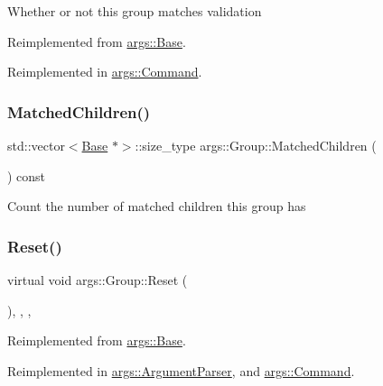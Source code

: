 Whether or not this group matches validation 

Reimplemented from \hyperlink{classargs_1_1_base_ae7ae4ca8ad953be1a353991c1df6ec4d}{args\+::\+Base}.



Reimplemented in \hyperlink{classargs_1_1_command_aebb9c512301e7f0c49689ed92568ef6e}{args\+::\+Command}.

\mbox{\label{classargs_1_1_group_a63697db6c1a28632775f852afface1ce}} 
\subsubsection{\texorpdfstring{Matched\+Children()}{MatchedChildren()}}
{\footnotesize\ttfamily std\+::vector$<$\hyperlink{classargs_1_1_base}{Base} $\ast$$>$\+::size\+\_\+type args\+::\+Group\+::\+Matched\+Children (\begin{DoxyParamCaption}{ }\end{DoxyParamCaption}) const\hspace{0.3cm}{\ttfamily [inline]}}

Count the number of matched children this group has \mbox{\label{classargs_1_1_group_a7ccee0f0ea0902b82029b2ab30f3f84b}} 
\subsubsection{\texorpdfstring{Reset()}{Reset()}}
{\footnotesize\ttfamily virtual void args\+::\+Group\+::\+Reset (\begin{DoxyParamCaption}{ }\end{DoxyParamCaption})\hspace{0.3cm}{\ttfamily [inline]}, {\ttfamily [override]}, {\ttfamily [virtual]}, {\ttfamily [noexcept]}}



Reimplemented from \hyperlink{classargs_1_1_base_ac7cfc851174f71e00173121d3013dab1}{args\+::\+Base}.



Reimplemented in \hyperlink{classargs_1_1_argument_parser_a73b0dc7bc87c3a44345879f34985237f}{args\+::\+Argument\+Parser}, and \hyperlink{classargs_1_1_command_aa1829501dd4f63ba3551bf85171be83e}{args\+::\+Command}.


